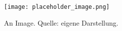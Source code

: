 \begin{figure}[H]
	\centering
	\texttt{[image: placeholder\_image.png]}
	\caption[An Image]{An Image. Quelle: eigene Darstellung.}
	\label{fig:an_image}
\end{figure}